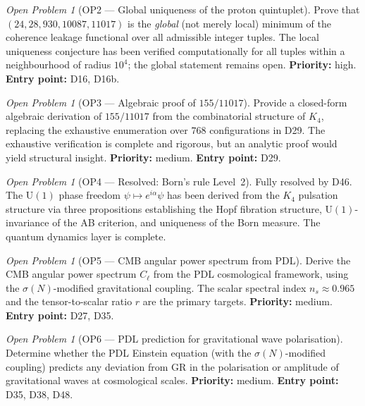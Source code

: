 \documentclass[11pt,a4paper]{article}
\theoremstyle{plain}
\theoremstyle{definition}
\theoremstyle{remark}
\newtheorem{openproblem}[theorem]{Open Problem}
\newcommand{\sigmaN}{\sigma(N)}
\begin{document}
\begin{openproblem}[OP2 --- Global uniqueness of the proton quintuplet]
\label{op:uniqueness}
Prove that \\  $(24, 28, 930, 10087, 11017)$ is the \emph{global} (not merely local) minimum of the coherence leakage functional over all admissible integer tuples. The local uniqueness conjecture has been verified computationally for all tuples within a neighbourhood of radius $10^4$; the global statement remains open. \textbf{Priority:} high. \textbf{Entry point:} D16, D16b.
\end{openproblem}

\begin{openproblem}[OP3 --- Algebraic proof of $155/11017$]
\label{op:gate1algebraic}
Provide a closed-form algebraic derivation of $155/11017$ from the combinatorial structure of $K_4$, replacing the exhaustive enumeration over $768$ configurations in D29. The exhaustive verification is complete and rigorous, but an analytic proof would yield structural insight. \textbf{Priority:} medium. \textbf{Entry point:} D29.
\end{openproblem}

\begin{openproblem}[OP4 --- Resolved: Born's rule Level~2]
\label{op:bornlevel2}
\textcolor{proofblue}{Fully resolved by D46.} The $\mathrm{U}(1)$ phase freedom $\psi \mapsto e^{i\alpha}\psi$ has been derived from the $K_4$ pulsation structure via three propositions establishing the Hopf fibration structure, $\mathrm{U}(1)$-invariance of the AB criterion, and uniqueness of the Born measure. The quantum dynamics layer is complete.
\end{openproblem}

\begin{openproblem}[OP5 --- CMB angular power spectrum from PDL]
\label{op:CMBspectrum}
Derive the CMB angular power spectrum $C_\ell$ from the PDL cosmological framework, using the $\sigmaN$-modified gravitational coupling. The scalar spectral index $n_s \approx 0.965$ and the tensor-to-scalar ratio $r$ are the primary targets. \textbf{Priority:} medium. \textbf{Entry point:} D27, D35.
\end{openproblem}

\begin{openproblem}[OP6 --- PDL prediction for gravitational wave polarisation]
\label{op:GW}
Determine whether the PDL Einstein equation (with the $\sigmaN$-modified coupling) predicts any deviation from GR in the polarisation or amplitude of gravitational waves at cosmological scales. \textbf{Priority:} medium. \textbf{Entry point:} D35, D38, D48.
\end{openproblem}
\end{document}
